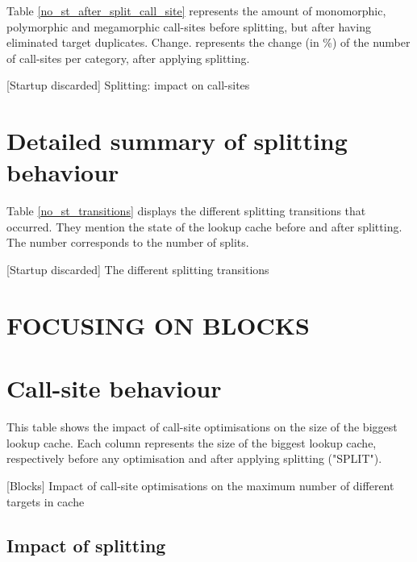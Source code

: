 \documentclass[preprint]{acmart}
\let\NoStartupBeforeAfterSplitSites\BeforeAfterSplitSites
\let\NoStartupSplittingTransitions\SplittingTransitions
\let\StartupBlocksExtent\BlocksExtent
\begin{document}
Table \ref{no_st_after_split_call_site} represents the amount of monomorphic, polymorphic and megamorphic call-sites before splitting, but after having eliminated target duplicates.
Change. represents the change (in \%) of the number of call-sites per category, after applying splitting.

\begin{table}[h!]
	\centering
	\NoStartupBeforeAfterSplitSites
	\caption{[Startup discarded] Splitting: impact on call-sites}
	\label{no_st_after_split_call_site}
\end{table}

\section{Detailed summary of splitting behaviour}

Table \ref{no_st_transitions} displays the different splitting transitions that occurred. They mention the state of the lookup cache before and after splitting. The number corresponds to the number of splits.

\begin{table}[h!]
	\centering
	\NoStartupSplittingTransitions
	\caption{[Startup discarded] The different splitting transitions}
	\label{no_st_transitions}
\end{table}

\section{FOCUSING ON BLOCKS}

\section{Call-site behaviour}

This table shows the impact of call-site optimisations on the size of the biggest lookup cache.
Each column represents the size of the biggest lookup cache, respectively before any optimisation and after applying splitting ("SPLIT").

\begin{table}[h!]
	\centering
	\StartupBlocksExtent
	\caption{[Blocks] Impact of call-site optimisations on the maximum number of different targets in cache}
\end{table}

\subsection{Impact of splitting}
\end{document}
